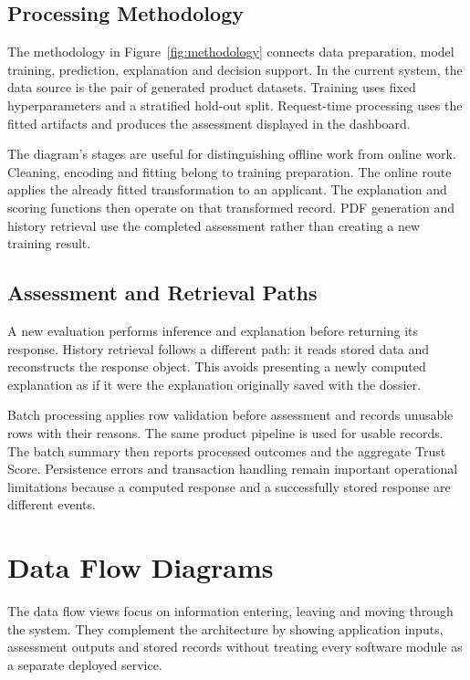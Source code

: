 
\subsection{Processing Methodology}
The methodology in Figure~\ref{fig:methodology} connects data preparation, model training, prediction, explanation and decision support. In the current system, the data source is the pair of generated product datasets. Training uses fixed hyperparameters and a stratified hold-out split. Request-time processing uses the fitted artifacts and produces the assessment displayed in the dashboard.

The diagram's stages are useful for distinguishing offline work from online work. Cleaning, encoding and fitting belong to training preparation. The online route applies the already fitted transformation to an applicant. The explanation and scoring functions then operate on that transformed record. PDF generation and history retrieval use the completed assessment rather than creating a new training result.


\subsection{Assessment and Retrieval Paths}
A new evaluation performs inference and explanation before returning its response. History retrieval follows a different path: it reads stored data and reconstructs the response object. This avoids presenting a newly computed explanation as if it were the explanation originally saved with the dossier.

Batch processing applies row validation before assessment and records unusable rows with their reasons. The same product pipeline is used for usable records. The batch summary then reports processed outcomes and the aggregate Trust Score. Persistence errors and transaction handling remain important operational limitations because a computed response and a successfully stored response are different events.

\clearpage
\section{Data Flow Diagrams}
The data flow views focus on information entering, leaving and moving through the system. They complement the architecture by showing application inputs, assessment outputs and stored records without treating every software module as a separate deployed service.

